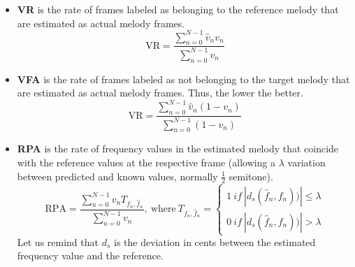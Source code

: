 \begin{itemize}
    \item \textbf{VR} is the rate of frames labeled as belonging to the reference melody that are estimated as actual melody frames.
    \begin{equation}
        \text{VR} = \frac{\sum_{n=0}^{N-1}\hat{v}_nv_n} {\sum_{n=0}^{N-1}v_n}
    \end{equation}
    \item \textbf{VFA} is the rate of frames labeled as not belonging to the target melody that are estimated as actual melody frames. Thus, the lower the better.
    \begin{equation}
        \text{VR} = \frac{\sum_{n=0}^{N-1}\hat{v}_n(1 - v_n)} {\sum_{n=0}^{N-1}(1 - v_n)}
    \end{equation}
    \item \textbf{RPA} is the rate of frequency values in the estimated melody that coincide with the reference values at the respective frame (allowing a $\lambda$ variation between predicted and known values, normally $\frac{1}{2}$ semitone). %
    \begin{equation}
        \text{RPA} = \frac{\sum_{n=0}^{N-1}v_nT_{f_n, \hat{f}_n}} {\sum_{n=0}^{N-1}v_n},\ \text{where}\ T_{f_n, \hat{f}_n} = \left\{\begin{matrix}
        1\ if \ \left | d_s(\hat{f}_n, f_n)) \right | \leq \lambda \\ 
        0\ if \ \left | d_s(\hat{f}_n, f_n)) \right | >  \lambda
        \end{matrix}\right.
    \end{equation}
    Let us remind that $d_s$ is the deviation in cents between the estimated frequency value and the reference.
    

\end{itemize}
